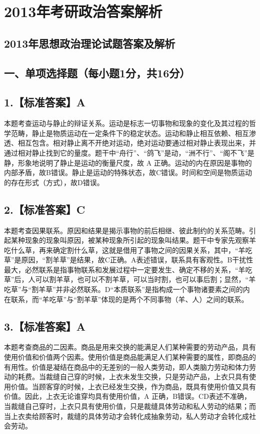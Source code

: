 \documentclass[UTF8,11pt]{ctexart}
\begin{document}
\section*{2013年考研政治答案解析}
\subsection*{2013年思想政治理论试题答案及解析}

\subsection*{一、单项选择题（每小题1分，共16分）}

\subsection*{1.【标准答案】A}

本题考查运动与静止的辩证关系。运动是标志一切事物和现象的变化及其过程的哲学范畴，静止是物质运动在一定条件下的稳定状态。运动和静止相互依赖、相互渗透、相互包含。相对静止离不开绝对运动，绝对运动要通过相对静止表现出来，并通过相对静止找到它的量度。题干中“舟行”、“鸽飞”是动，“洲不行”、“阁不飞”是静，形象地说明了静止是运动的衡量尺度，故 A 正确。运动的内在原因是事物的内部矛盾，故B错误。静止是运动的特殊状态，故C错误。时间和空间是物质运动的存在形式（方式），故D错误。


\subsection*{2.【标准答案】C}

本题考查因果联系。原因和结果是揭示事物的前后相继、彼此制约的关系范畴。引起某种现象的现象叫原因，被某种现象所引起的现象叫结果。题干中专家先观察羊吃什么草，再来确定割什么草，这就是借用了事物之间的因果关系，其中，“羊吃草”是原因，“割羊草”是结果，故C正确。A表述错误，联系具有客观性。B干扰性最大，必然联系是指事物联系和发展过程中一定要发生、确定不移的关系，“羊吃草”后，人可以割羊草，也可以不割羊草，可以当时割，也可以事后割；显然，“羊吃草”与“割羊草”并非必然联系。D“本质联系”是指构成一个事物诸要素之间的内在联系，而“羊吃草”与“割羊草”体现的是两个不同事物（羊、人）之间的联系。


\subsection*{3.【标准答案】A}

本题考查商品的二因素。商品是用来交换的能满足人们某种需要的劳动产品，具有使用价值和价值两个因素。使用价值是商品能满足人们某种需要的属性，即商品的有用性。价值是凝结在商品中的无差别的一般人类劳动，即人类脑力劳动和体力劳动的耗费。当裁缝自己穿的时候，上衣未发生交换，只是劳动产品，上衣只具有使用价值。当顾客穿的时候，上衣已经发生交换，作为商品，既具有使用价值又具有价值。因此，上衣无论谁穿均具有使用价值，A 正确，B错误。CD表述不准确，当裁缝自己穿时，上衣只具有使用价值，只是裁缝具体劳动和私人劳动的结果；而当上衣卖给顾客时，裁缝的具体劳动才会转化成抽象劳动，私人劳动才会转化成社会劳动。
\end{document}
